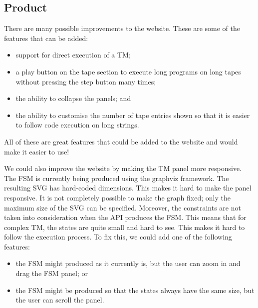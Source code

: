  \subsection{Product}
There are many possible improvements to the website. These are some of the features that can be added:
\begin{itemize}
    \item support for direct execution of a TM;
    \item a play button on the tape section to execute long programs on long tapes without pressing the step button many times;
    \item the ability to collapse the panels; and
    \item the ability to customise the number of tape entries shown so that it is easier to follow code execution on long strings.
\end{itemize}
All of these are great features that could be added to the website and would make it easier to use!

We could also improve the website by making the TM panel more responsive. The FSM is currently being produced using the graphviz framework. The resulting SVG has hard-coded dimensions. This makes it hard to make the panel responsive. It is not completely possible to make the graph fixed; only the maximum size of the SVG can be specified. Moreover, the constraints are not taken into consideration when the API produces the FSM. This means that for complex TM, the states are quite small and hard to see. This makes it hard to follow the execution process. To fix this, we could add one of the following features:
\begin{itemize}
    \item the FSM might produced as it currently is, but the user can zoom in and drag the FSM panel; or
    \item the FSM might be produced so that the states always have the same size, but the user can scroll the panel. 
\end{itemize}
